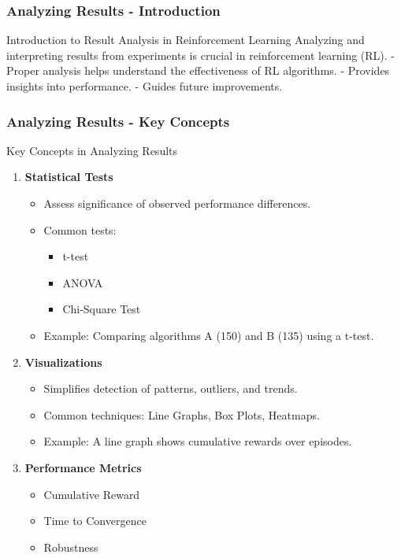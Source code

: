 \documentclass[aspectratio=169]{beamer}
\begin{document}
\begin{frame}[fragile]
  \frametitle{Analyzing Results - Introduction}
  \begin{block}{Introduction to Result Analysis in Reinforcement Learning}
    Analyzing and interpreting results from experiments is crucial in reinforcement learning (RL). 
    - Proper analysis helps understand the effectiveness of RL algorithms.
    - Provides insights into performance.
    - Guides future improvements.
  \end{block}
\end{frame}

\begin{frame}[fragile]
  \frametitle{Analyzing Results - Key Concepts}
  \begin{block}{Key Concepts in Analyzing Results}
  \begin{enumerate}
    \item \textbf{Statistical Tests}
      \begin{itemize}
        \item Assess significance of observed performance differences.
        \item Common tests: 
          \begin{itemize}
            \item t-test
            \item ANOVA
            \item Chi-Square Test
          \end{itemize}
        \item Example: Comparing algorithms A (150) and B (135) using a t-test.
      \end{itemize}
      
    \item \textbf{Visualizations}
      \begin{itemize}
        \item Simplifies detection of patterns, outliers, and trends.
        \item Common techniques: Line Graphs, Box Plots, Heatmaps.
        \item Example: A line graph shows cumulative rewards over episodes.
      \end{itemize}
      
    \item \textbf{Performance Metrics}
      \begin{itemize}
        \item Cumulative Reward
        \item Time to Convergence
        \item Robustness
      \end{itemize}  
  \end{enumerate}
  \end{block}
\end{frame}
\end{document}
